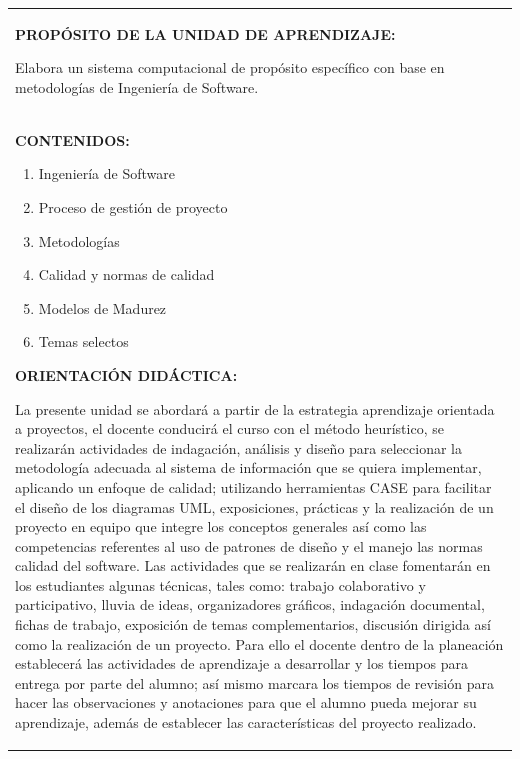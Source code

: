 \documentclass[10pt]{article}
\begin{document}
\begin{table}[H]
  \begin{tabular}{|p{}|}
    \hline
    \textbf{PROPÓSITO DE LA UNIDAD DE APRENDIZAJE:}

    Elabora un sistema computacional de propósito específico con base en metodologías de Ingeniería de Software. \\

    \textbf{CONTENIDOS:}
    \begin{enumerate}[I]
    \setlength{\itemsep}{0pt}
    \setlength{\parskip}{0pt}
    \item Ingeniería de Software
\item Proceso de gestión de proyecto
\item Metodologías
\item Calidad y normas de calidad
\item Modelos de Madurez
\item Temas selectos

    \end{enumerate}

    \textbf{ORIENTACIÓN DIDÁCTICA:}

    La presente unidad se abordará a partir de la estrategia aprendizaje orientada a proyectos, el docente conducirá el curso con el método heurístico, se realizarán actividades de indagación, análisis y diseño para seleccionar la metodología adecuada al sistema de información que se quiera implementar, aplicando un enfoque de calidad; utilizando herramientas CASE para facilitar el diseño de los diagramas UML, exposiciones, prácticas y la realización de un proyecto en equipo que integre los conceptos generales así como las competencias referentes al uso de patrones de diseño y el manejo las normas calidad del software.
Las actividades que se realizarán en clase fomentarán en los estudiantes algunas técnicas, tales como: trabajo colaborativo y participativo, lluvia de ideas, organizadores gráficos, indagación documental, fichas de trabajo, exposición de temas complementarios, discusión dirigida así como la realización de un proyecto.
Para ello el docente dentro de la planeación establecerá las actividades de aprendizaje a desarrollar y los tiempos para entrega por parte del alumno; así mismo marcara los tiempos de revisión para hacer las observaciones y anotaciones para que el alumno pueda mejorar su aprendizaje, además de establecer las características del proyecto realizado. \\ 


\end{tabular}
\end{table}
\end{document}

